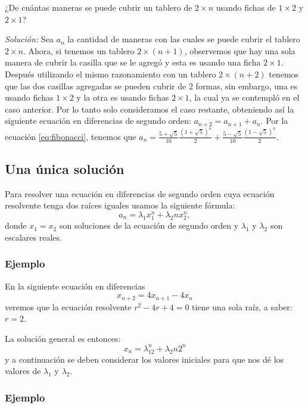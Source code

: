 \documentclass{article}
\begin{document}
¿De cuántas maneras se puede cubrir un tablero de $2\times n$ usando
fichas de $1\times 2$ y $2\times 1$?

\textit{Solución:} Sea $a_n$ la cantidad de maneras con las cuales se
puede cubrir el tablero $2\times n$. Ahora, si tenemos un tablero
$2\times (n+1)$, observemos que hay una sola manera de cubrir la
casilla que se le agregó y esta es usando una ficha $2\times 1$.
Después utilizando el mismo razonamiento con un tablero
$2\times (n+2)$ tenemos que las dos casillas agregadas se pueden
cubrir de 2 formas, sin embargo, una es usando fichas $1\times 2$ y la
otra es usando fichas $2\times 1$, la cual ya se contempló en el caso
anterior. Por lo tanto solo consideramos el caso restante, obteniendo
así la siguiente ecuación en diferencias de segundo orden:
$a_{n+2}=a_{n+1}+a_n$.  Por la ecuación \eqref{eq:fibonacci}, tenemos
que
$a_n=\frac{5+\sqrt{5}}{10}\frac{(1+\sqrt{5})^n}{2} +
\frac{5-\sqrt{5}}{10}\frac{(1-\sqrt{5})^n}{2}$.




\subsection{Una única solución}
\label{sec:unica}

Para resolver una ecuación en diferencias de segundo orden cuya
ecuación resolvente tenga dos raíces iguales usamos la siguiente fórmula:
\begin{equation}
 \label{raicesiguales}
 a_n=\lambda_1x_1^n +\lambda_2nx_2^n,
\end{equation}
donde $x_1=x_2$ son soluciones de la ecuación de segundo orden y
$\lambda_1$ y $\lambda_2$ son escalares reales.

\subsubsection{Ejemplo}

En la siguiente ecuación en diferencias
\begin{equation}
  \label{eq:1}
  x_{n+2}=4x_{n+1}-4x_{n}
\end{equation}
veremos que la ecuación resolvente $r^2-4r+4=0$ tiene una sola raíz, a
saber: $r=2$.

La solución general es entonces:
$$x_n=\lambda_12^n+\lambda_2n2^n$$
y a continuación se deben considerar los valores iniciales para que
nos dé los valores de $\lambda_1$ y $\lambda_2$.

\subsubsection{Ejemplo}
\end{document}
